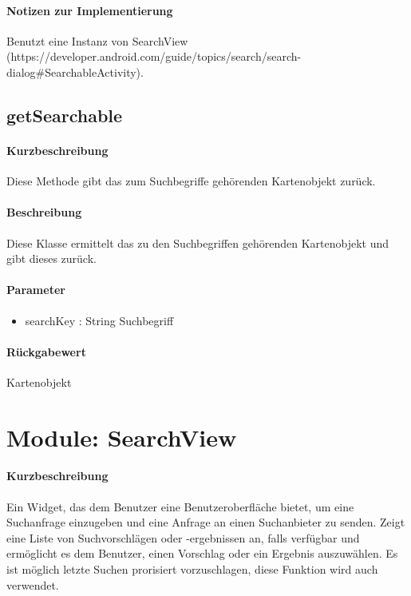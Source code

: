 \paragraph*{Notizen zur Implementierung}
Benutzt eine Instanz von SearchView (https://developer.android.com/guide/topics/search/search-dialog#SearchableActivity).

\subsection{getSearchable}%
\paragraph*{Kurzbeschreibung}
Diese Methode gibt das zum Suchbegriffe gehörenden Kartenobjekt zurück.
\paragraph*{Beschreibung}
Diese Klasse ermittelt das zu den Suchbegriffen gehörenden Kartenobjekt und gibt dieses zurück.
\paragraph*{Parameter}
\begin{itemize}
    \item searchKey : String Suchbegriff
\end{itemize}
\paragraph*{Rückgabewert}
Kartenobjekt


\section{Module: SearchView}
\paragraph*{Kurzbeschreibung}
Ein Widget, das dem Benutzer eine Benutzeroberfläche bietet, um eine Suchanfrage einzugeben und eine Anfrage an einen Suchanbieter zu senden. 
Zeigt eine Liste von Suchvorschlägen oder -ergebnissen an, falls verfügbar 
und ermöglicht es dem Benutzer, einen Vorschlag oder ein Ergebnis auszuwählen.
Es ist möglich letzte Suchen prorisiert vorzuschlagen, diese Funktion wird auch verwendet.
